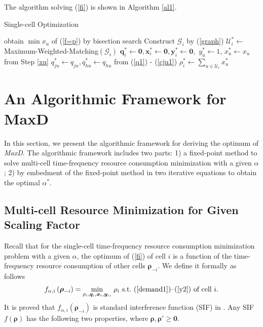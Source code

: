 \documentclass[10pt,journal,final,finalsubmission,twocolumn]{IEEEtran}
\begin{document}
The algorithm solving (\ref{fi}) is shown in Algorithm \ref{al1}.

 \begin{algorithm}[tbp]\label{al1}
\caption{Single-cell Optimization} 
{
	obtain $\min x_u$ of (\ref{f=p}) by bisection search\label{xu}\;
}
Construct $\mathcal{G}_i$ by (\ref{graph})\;
$\mathcal{U}^*_i\leftarrow $ Maximum-Weighted-Matching$\left (\mathcal{G}_i\right)$\label{MWM}\;
$\boldsymbol{q}^*_i \leftarrow \boldsymbol{0},\boldsymbol{x}^*_i \leftarrow \boldsymbol{0}, \boldsymbol{y}^*_i \leftarrow \boldsymbol{0},$\;
{
$y_u^*\leftarrow1$, $x_u^* \leftarrow x_u$ from Step \ref{xu} \;
$q_{ju}^*\leftarrow q_{ju}, q_{hu}^*\leftarrow q_{hu}$ from (\ref{q1}) - (\ref{cju1})\;
}
$\rho_i^*\leftarrow\sum_{u\in{\mathcal{U}}_i} x_u^*$\;
\;
\end{algorithm} 


\section{An Algorithmic Framework for MaxD}\label{CellLoadsMinimization}

In this section, we present the algorithmic framework for deriving the optimum of {\em MaxD}. The algorithmic framework includes two parts: 1) a fixed-point method to solve multi-cell time-frequency resource consumption minimization with a given $\alpha$; 2) by embedment of the fixed-point method in two iterative equations to obtain the optimal $\alpha^*$.

\subsection{Multi-cell Resource Minimization for Given Scaling Factor}\label{MulticellLoadsMinimization}

Recall that for the single-cell time-frequency resource consumption minimization problem with a given $\alpha$, the optimum of (\ref{fi}) of cell $i$ is a function of the time-frequency resource consumption of other cells $\boldsymbol{\rho}_{-i}$. We define it formally as follows
\begin{equation}\label{fi2}
f_{\alpha,i}\left (\boldsymbol{\rho}_{-i}\right ) =  \underset{\rho_i, \boldsymbol{q}_i,\boldsymbol{x}_i,\boldsymbol{y}_i,}{\min} \ \rho_i\  \textup{s.t.\ (\ref{demand1})--(\ref{y2}) of cell $i$} .
\end{equation}
It is proved that $f_{\alpha,i}\left (\boldsymbol{\rho}_{-i}\right )$ is standard interference function (SIF) in \cite{Yates}. Any SIF $f\left( \boldsymbol{\rho}\right)$ has the following two properties, where $\boldsymbol{\rho}, \boldsymbol{\rho}' \geq \boldsymbol{0}$.
\end{document}
